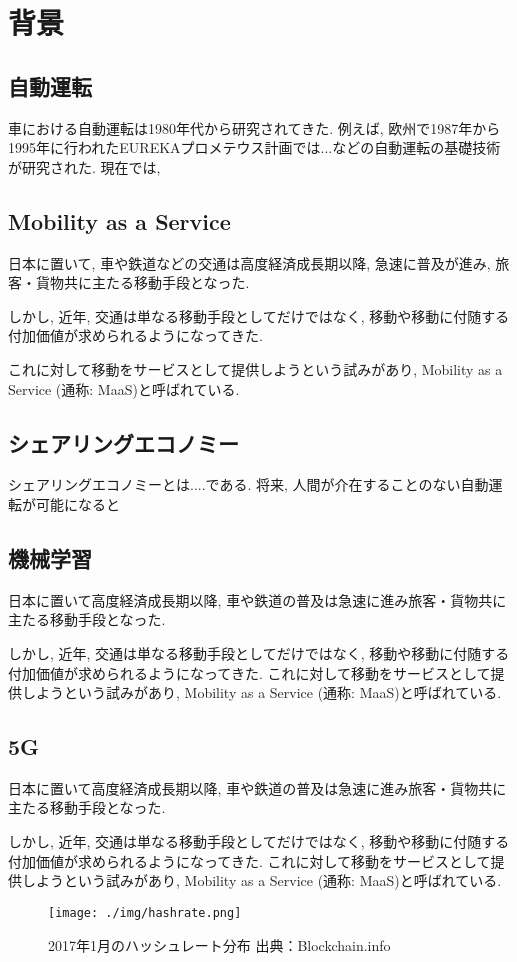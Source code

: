 \chapter{背景}
\label{background}


\section{自動運転}

車における自動運転は1980年代から研究されてきた.
例えば, 欧州で1987年から1995年に行われたEUREKAプロメテウス計画では...などの自動運転の基礎技術が研究された.
現在では, 


\section{Mobility as a Service}

日本に置いて, 車や鉄道などの交通は高度経済成長期以降, 急速に普及が進み, 旅客・貨物共に主たる移動手段となった. 

しかし, 近年, 交通は単なる移動手段としてだけではなく, 移動や移動に付随する付加価値が求められるようになってきた.

これに対して移動をサービスとして提供しようという試みがあり, Mobility as a Service (通称: MaaS)と呼ばれている.


\section{シェアリングエコノミー}

シェアリングエコノミーとは....である. 将来, 人間が介在することのない自動運転が可能になると

\section{機械学習}

日本に置いて高度経済成長期以降, 車や鉄道の普及は急速に進み旅客・貨物共に主たる移動手段となった.

しかし, 近年, 交通は単なる移動手段としてだけではなく, 移動や移動に付随する付加価値が求められるようになってきた.
これに対して移動をサービスとして提供しようという試みがあり, Mobility as a Service (通称: MaaS)と呼ばれている.


\section{5G}

日本に置いて高度経済成長期以降, 車や鉄道の普及は急速に進み旅客・貨物共に主たる移動手段となった.

しかし, 近年, 交通は単なる移動手段としてだけではなく, 移動や移動に付随する付加価値が求められるようになってきた.
これに対して移動をサービスとして提供しようという試みがあり, Mobility as a Service (通称: MaaS)と呼ばれている.


\begin{figure}[h]
    \begin{center}
        \texttt{[image: ./img/hashrate.png]}
        \caption{2017年1月のハッシュレート分布 出典：Blockchain.info\cite{bitcoinhashrate}}
        \label{img:hashrate}
    \end{center}
\end{figure}
\fi
